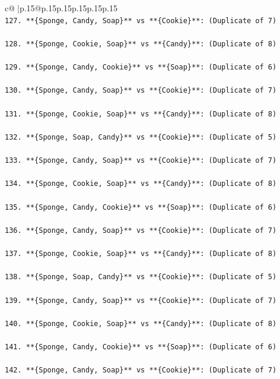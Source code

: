 \documentclass{article}
\begin{document}
{\begin{supertabular}{c@{$\;$}|p{.15\linewidth}@{}p{.15\linewidth}p{.15\linewidth}p{.15\linewidth}p{.15\linewidth}p{.15\linewidth}}
{{{\\ 
\texttt{127. **\{Sponge, Candy, Soap\}** vs **\{Cookie\}**: (Duplicate of 7)} \\
\\ 
\texttt{128. **\{Sponge, Cookie, Soap\}** vs **\{Candy\}**: (Duplicate of 8)} \\
\\ 
\texttt{129. **\{Sponge, Candy, Cookie\}** vs **\{Soap\}**: (Duplicate of 6)} \\
\\ 
\texttt{130. **\{Sponge, Candy, Soap\}** vs **\{Cookie\}**: (Duplicate of 7)} \\
\\ 
\texttt{131. **\{Sponge, Cookie, Soap\}** vs **\{Candy\}**: (Duplicate of 8)} \\
\\ 
\texttt{132. **\{Sponge, Soap, Candy\}** vs **\{Cookie\}**: (Duplicate of 5)} \\
\\ 
\texttt{133. **\{Sponge, Candy, Soap\}** vs **\{Cookie\}**: (Duplicate of 7)} \\
\\ 
\texttt{134. **\{Sponge, Cookie, Soap\}** vs **\{Candy\}**: (Duplicate of 8)} \\
\\ 
\texttt{135. **\{Sponge, Candy, Cookie\}** vs **\{Soap\}**: (Duplicate of 6)} \\
\\ 
\texttt{136. **\{Sponge, Candy, Soap\}** vs **\{Cookie\}**: (Duplicate of 7)} \\
\\ 
\texttt{137. **\{Sponge, Cookie, Soap\}** vs **\{Candy\}**: (Duplicate of 8)} \\
\\ 
\texttt{138. **\{Sponge, Soap, Candy\}** vs **\{Cookie\}**: (Duplicate of 5)} \\
\\ 
\texttt{139. **\{Sponge, Candy, Soap\}** vs **\{Cookie\}**: (Duplicate of 7)} \\
\\ 
\texttt{140. **\{Sponge, Cookie, Soap\}** vs **\{Candy\}**: (Duplicate of 8)} \\
\\ 
\texttt{141. **\{Sponge, Candy, Cookie\}** vs **\{Soap\}**: (Duplicate of 6)} \\
\\ 
\texttt{142. **\{Sponge, Candy, Soap\}** vs **\{Cookie\}**: (Duplicate of 7)} \\
}}}
\end{supertabular}}
\end{document}
